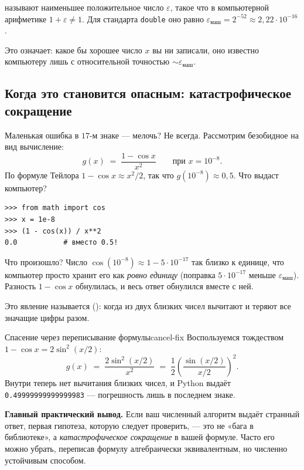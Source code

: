 \begin{notebox}[title={Машинная точность $\varepsilon_{\text{маш}}$}]
 называют наименьшее положительное число
$\varepsilon$, такое что в компьютерной арифметике
$1+\varepsilon \neq 1$. Для стандарта \texttt{double} оно равно
$\varepsilon_{\text{маш}} = 2^{-52}\approx 2{,}22\cdot 10^{-16}$.

Это означает: какое бы хорошее число $x$ вы ни записали, оно
известно компьютеру лишь с относительной точностью
$\sim\varepsilon_{\text{маш}}$.
\end{notebox}

\subsection{Когда это становится опасным: катастрофическое сокращение}

Маленькая ошибка в $17$-м знаке — мелочь? Не всегда. Рассмотрим
безобидное на вид вычисление:
\[
g(x) \;=\; \dfrac{1-\cos x}{x^{2}}\qquad\text{при }x=10^{-8}.
\]
По формуле Тейлора $1-\cos x \approx x^{2}/2$, так что
$g(10^{-8})\approx 0{,}5$. Что выдаст компьютер?

\begin{lstlisting}[label={lst:cancel}]
>>> from math import cos
>>> x = 1e-8
>>> (1 - cos(x)) / x**2
0.0           # вместо 0.5!
\end{lstlisting}

Что произошло? Число $\cos(10^{-8})\approx 1-5\cdot 10^{-17}$ так
близко к единице, что компьютер просто хранит его как
\emph{ровно единицу} (поправка $5\cdot 10^{-17}$ меньше
$\varepsilon_{\text{маш}}$). Разность $1-\cos x$ обнулилась, и весь
ответ обнулился вместе с ней.

Это явление называется 
(): когда из двух близких чисел
вычитают и теряют все значащие цифры разом.

\begin{example}{Спасение через переписывание формулы}{cancel-fix}
Воспользуемся тождеством $1-\cos x = 2\sin^{2}(x/2)$:
\[
g(x) \;=\; \dfrac{2\sin^{2}(x/2)}{x^{2}}\;=\;\dfrac12\!\left(\dfrac{\sin(x/2)}{x/2}\right)^{2}.
\]
Внутри теперь нет вычитания близких чисел, и Python выдаёт
\texttt{0.49999999999999983} — погрешность лишь в последнем знаке.
\end{example}

\begin{importantbox}
\textbf{Главный практический вывод.} Если ваш численный алгоритм
выдаёт странный ответ, первая гипотеза, которую следует проверить, —
это не «бага в библиотеке», а \emph{катастрофическое сокращение} в
вашей формуле. Часто его можно убрать, переписав формулу
алгебраически эквивалентным, но численно устойчивым способом.
\end{importantbox}

